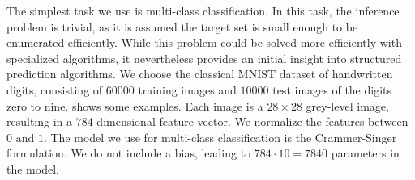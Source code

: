 The simplest task we use is multi-class classification. In this task,
the inference problem is trivial, as it is assumed the target set is small enough
to be enumerated efficiently. While this problem could be solved more efficiently
with specialized algorithms, it nevertheless provides an initial insight into structured
prediction algorithms.
We choose the classical MNIST dataset of handwritten digits, consisting of
$60000$ training images and $10000$ test images of the digits zero to nine.
 shows some examples. Each image is a $28{\times}28$
grey-level image, resulting in a $784$-dimensional feature vector. We normalize
the features between $0$ and $1$.
%
\enlargethispage{15mm}
The model we use for multi-class classification is the Crammer-Singer
formulation. We do not include a bias, leading to $784 \cdot 10 = 7840$
parameters in the model.


